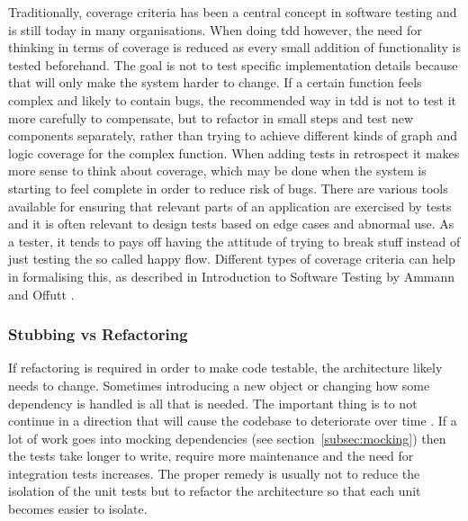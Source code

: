 \documentclass[11pt]{article}
\begin{document}
Traditionally, coverage criteria has been a central concept in software testing and is still today in many organisations. When doing \gls{tdd} however, the need for thinking in terms of coverage is reduced as every small addition of functionality is tested beforehand. The goal is not to test specific implementation details because that will only make the system harder to change. If a certain function feels complex and likely to contain bugs, the recommended way in \gls{tdd} is not to test it more carefully to compensate, but to refactor in small steps and test new components separately, rather than trying to achieve different kinds of graph and logic coverage for the complex function. When adding tests in retrospect it makes more sense to think about coverage, which may be done when the system is starting to feel complete in order to reduce risk of bugs. There are various tools available for ensuring that relevant parts of an application are exercised by tests and it is often relevant to design tests based on edge cases and abnormal use. As a tester, it tends to pays off having the attitude of trying to break stuff instead of just testing the so called happy flow. Different types of coverage criteria can help in formalising this, as described in Introduction to Software Testing by Ammann and Offutt \cite{AmmannOffutt}.

\label{subsec:coveragecriteria}

\subsubsection{Stubbing vs Refactoring}

If refactoring is required in order to make code testable, the architecture likely needs to change. Sometimes introducing a new object or changing how some dependency is handled is all that is needed. The important thing is to not continue in a direction that will cause the codebase to deteriorate over time \cite[question~34]{Stenmark}. If a lot of work goes into mocking dependencies (see section~\ref{subsec:mocking}) then the tests take longer to write, require more maintenance and the need for integration tests increases. The proper remedy is usually not to reduce the isolation of the unit tests but to refactor the architecture so that each unit becomes easier to isolate. \cite[question~42]{Stenmark}
\end{document}
